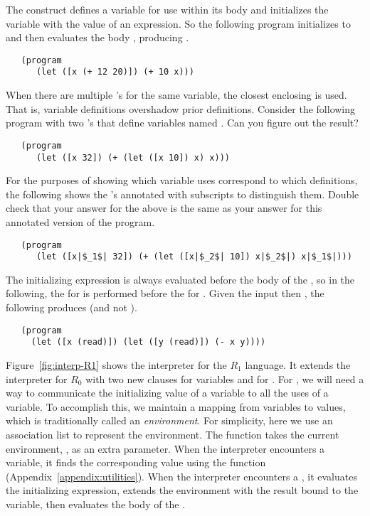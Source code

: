\documentclass[11pt]{book}
\begin{document}
The  construct defines a variable for use within its body
and initializes the variable with the value of an expression.  So the
following program initializes  to  and then evaluates
the body , producing .
\begin{lstlisting}
   (program
      (let ([x (+ 12 20)]) (+ 10 x)))
\end{lstlisting}
When there are multiple 's for the same variable, the closest
enclosing  is used. That is, variable definitions overshadow
prior definitions. Consider the following program with two 's
that define variables named . Can you figure out the result?
\begin{lstlisting}
   (program
      (let ([x 32]) (+ (let ([x 10]) x) x)))
\end{lstlisting}
For the purposes of showing which variable uses correspond to which
definitions, the following shows the 's annotated with subscripts
to distinguish them. Double check that your answer for the above is
the same as your answer for this annotated version of the program.
\begin{lstlisting}
   (program
      (let ([x|$_1$| 32]) (+ (let ([x|$_2$| 10]) x|$_2$|) x|$_1$|)))
\end{lstlisting}
The initializing expression is always evaluated before the body of the
, so in the following, the  for  is
performed before the  for . Given the input
 then , the following produces  (and not
).
\begin{lstlisting}
   (program
     (let ([x (read)]) (let ([y (read)]) (- x y))))
\end{lstlisting}

Figure~\ref{fig:interp-R1} shows the interpreter for the $R_1$
language. It extends the interpreter for $R_0$ with two new
 clauses for variables and for .  For ,
we will need a way to communicate the initializing value of a variable
to all the uses of a variable. To accomplish this, we maintain a
mapping from variables to values, which is traditionally called an
\emph{environment}. For simplicity, here we use an association list to
represent the environment. The  function takes the
current environment, , as an extra parameter.  When the
interpreter encounters a variable, it finds the corresponding value
using the  function (Appendix~\ref{appendix:utilities}).
When the interpreter encounters a , it evaluates the
initializing expression, extends the environment with the result bound
to the variable, then evaluates the body of the .
\end{document}
